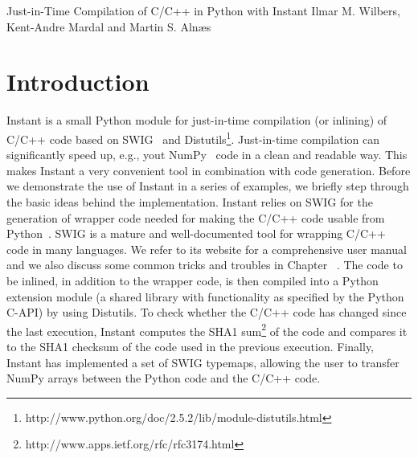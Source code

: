 


\newcommand{\emp}[1]{\texttt{#1}}
\newcommand{\bit}{\begin{itemize}}
\newcommand{\eit}{\end{itemize}}

{Just-in-Time Compilation of C/C++ in Python with Instant}
{Ilmar M. Wilbers, Kent-Andre Mardal and Martin S. Aln{\ae}s}

%




\section{Introduction}
Instant is a small Python module for just-in-time compilation (or inlining) of
C/C++ code based on SWIG~\cite{SWIG} and
Distutils\footnote{http://www.python.org/doc/2.5.2/lib/module-distutils.html}. 
Just-in-time compilation can significantly speed up, e.g., yout NumPy~\cite{NumPy} code in a clean and
readable way. This makes Instant a very convenient tool in combination with code
generation. Before we demonstrate the use of Instant in a series of examples,
we briefly step through the basic ideas behind the implementation.
Instant relies on SWIG for the generation of wrapper code needed for making the
C/C++ code usable from Python~\cite{Python}. SWIG is a mature and well-documented tool
for wrapping C/C++ code in many languages. We refer to its website for a comprehensive 
user manual and we also discuss some common tricks and troubles in Chapter ~\cite{mixedlanguage}. 
The code to be inlined, in addition to the
wrapper code, is then compiled into a Python extension module (a shared library
with functionality as specified by the Python C-API) by using
Distutils. To check whether the C/C++ code has changed since the last
execution, Instant computes the SHA1
sum\footnote{http://www.apps.ietf.org/rfc/rfc3174.html} of the code and compares it to
the SHA1 checksum of the code used in the previous execution. Finally, Instant has
implemented a set of SWIG typemaps, allowing the user to
transfer NumPy arrays between the Python code and the C/C++ code.

